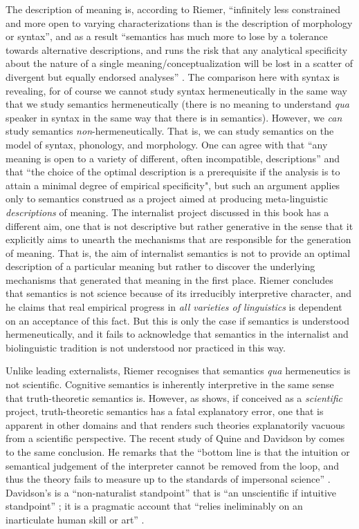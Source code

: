 The description of meaning is, according to Riemer, “infinitely less constrained and more open to varying characterizations than is the description of morphology or syntax”, and as a result “semantics has much more to lose by a tolerance towards alternative descriptions, and runs the risk that any analytical specificity about the nature of a single meaning/conceptualization will be lost in a scatter of divergent but equally endorsed analyses” \citep[8]{Riemer2005}. The comparison here with syntax is revealing, for of course we cannot study syntax hermeneutically in the same way that we study semantics hermeneutically (there is no meaning to understand \textit{qua} speaker in syntax in the same way that there is in semantics). However, we \textit{can} study semantics \textit{non}-hermeneutically. That is, we can study semantics on the model of syntax, phonology, and morphology. One can agree with \citet[8]{Riemer2005} that “any meaning is open to a variety of different, often incompatible, descriptions” and that “the choice of the optimal description is a prerequisite if the analysis is to attain a minimal degree of empirical specificity", but such an argument applies only to semantics construed as a project aimed at producing meta-linguistic \textit{descriptions} of meaning. The internalist project discussed in this book has a different aim, one that is not descriptive but rather generative in the sense that it explicitly aims to unearth the mechanisms that are responsible for the generation of meaning. That is, the aim of internalist semantics is not to provide an optimal description of a particular meaning but rather to discover the underlying mechanisms that generated that meaning in the first place. Riemer concludes that semantics is not science because of its irreducibly interpretive character, and he claims that real empirical progress in \textit{all varieties of linguistics} is dependent on an acceptance of this fact. But this is only the case if semantics is understood hermeneutically, and it fails to acknowledge that semantics in the internalist and biolinguistic tradition is not understood nor practiced in this way.

Unlike leading externalists, Riemer recognises that semantics \textit{qua} hermeneutics is not scientific. Cognitive semantics is inherently interpretive in the same sense that truth-theoretic semantics is. However, as \citet{Slezak2018} shows, if conceived as a \textit{scientific} project, truth-theoretic semantics has a fatal explanatory error, one that is apparent in other domains and that renders such theories explanatorily vacuous from a scientific perspective. The recent study of Quine and Davidson by \citet{Kemp2012} comes to the same conclusion. He remarks that the “bottom line is that the intuition or semantical judgement of the interpreter cannot be removed from the loop, and thus the theory fails to measure up to the standards of impersonal science” \citep[12]{Kemp2012}. Davidson’s is a “non-naturalist standpoint” that is “an unscientific if intuitive standpoint” \citep[12]{Kemp2012}; it is a pragmatic account that “relies ineliminably on an inarticulate human skill or art” \citep[143]{Kemp2012}.

